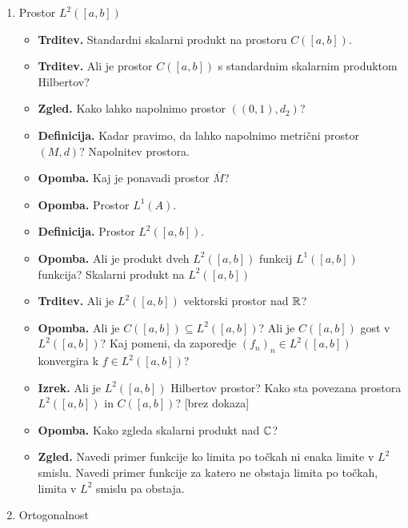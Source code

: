 \begin{enumerate}
    \item Prostor \(L^2([a,b])\)
    \begin{itemize}
        \item \textbf{Trditev.} Standardni skalarni produkt na prostoru \(C([a,b])\).
        \item \textbf{Trditev.} Ali je prostor \(C([a,b])\) s standardnim skalarnim produktom Hilbertov?
        \item \textbf{Zgled.} Kako lahko napolnimo prostor \(((0,1), d_2)\)?
        \item \textbf{Definicija.} Kadar pravimo, da lahko napolnimo metrični prostor \((M, d)\)? Napolnitev prostora.
        \item \textbf{Opomba.} Kaj je ponavadi prostor \(\overline{M}\)?
        \item \textbf{Opomba.} Prostor \(L^1(A)\).
        \item \textbf{Definicija.} Prostor \(L^2([a,b])\).
        \item \textbf{Opomba.} Ali je produkt dveh \(L^2([a,b])\) funkcij \(L^1([a,b])\) funkcija? Skalarni produkt na \(L^2([a,b])\)
        \item \textbf{Trditev.} Ali je \(L^2([a,b])\) vektorski prostor nad \(\mathbb{R}\)?
        \item \textbf{Opomba.} Ali je \(C([a,b]) \subseteq L^2([a,b])\)? Ali je \(C([a,b])\) gost v \(L^2([a,b])\)? Kaj pomeni, da zaporedje \((f_n)_n \in L^2([a,b])\) konvergira k \(f \in L^2([a,b])\)?
        \item \textbf{Izrek.} Ali je \(L^2([a,b])\) Hilbertov prostor? Kako sta povezana prostora \(L^2([a,b])\) in \(C([a, b])\)? [brez dokaza]
        \item \textbf{Opomba.} Kako zgleda skalarni produkt nad \(\mathbb{C}\)?
        \item \textbf{Zgled.} Navedi primer funkcije ko limita po točkah ni enaka limite v \(L^2\) smislu. Navedi primer funkcije za katero ne obstaja limita po točkah, limita v \(L^2\) smislu pa obstaja.
    \end{itemize}

    \item Ortogonalnost
    

\end{enumerate}
